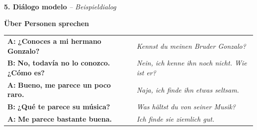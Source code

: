 \documentclass[11pt, a4paper]{article}
\newcommand{\seriftext}[1]{{\fontfamily{ppl}\selectfont #1}}
\newcommand{\es}[1]{\seriftext{\textbf{#1}}}
\newcommand{\de}[1]{\textit{\textcolor{akzent}{#1}}}
\newcommand{\abschnitt}[2]{\noindent\textbf{\large #1. #2}}
\begin{document}
\newpage

\abschnitt{5}{Diálogo modelo} \de{-- Beispieldialog}

\vspace{4pt}

\begin{merkbox}
\textbf{Über Personen sprechen}

\vspace{4pt}
{\small
\begin{tabular}{@{}p{7cm}p{6.5cm}@{}}
\textbf{A:} \es{¿Conoces a mi hermano Gonzalo?} & \de{Kennst du meinen Bruder Gonzalo?} \\[3pt]
\textbf{B:} \es{No, todavía no lo conozco. ¿Cómo es?} & \de{Nein, ich kenne ihn noch nicht. Wie ist er?} \\[3pt]
\textbf{A:} \es{Bueno, me parece un poco raro.} & \de{Naja, ich finde ihn etwas seltsam.} \\[3pt]
\textbf{B:} \es{¿Qué te parece su música?} & \de{Was hältst du von seiner Musik?} \\[3pt]
\textbf{A:} \es{Me parece bastante buena.} & \de{Ich finde sie ziemlich gut.} \\
\end{tabular}}
\end{merkbox}

\vspace{8pt}
\end{document}
